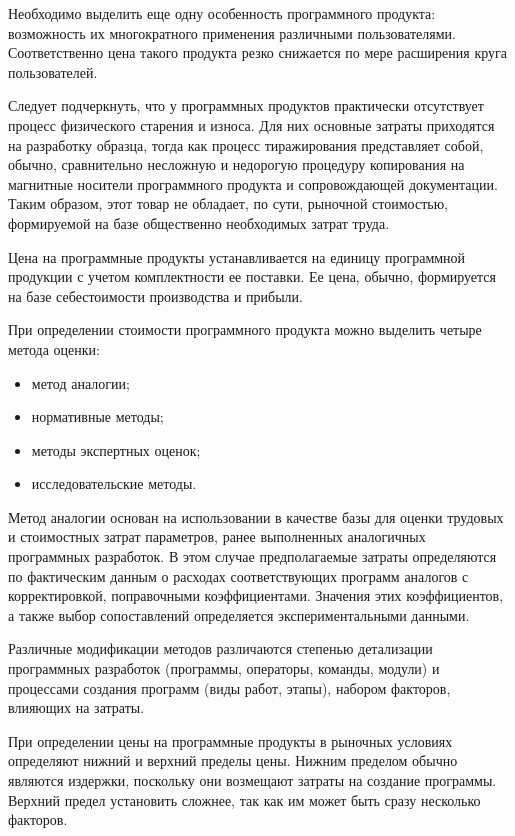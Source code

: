 \documentclass[utf8,usehyperref,12pt]{G7-32}
\begin{document}
Необходимо выделить еще одну особенность программного продукта: возможность их многократного применения различными пользователями. Соответственно цена такого продукта резко снижается по мере расширения круга пользователей.

Следует подчеркнуть, что у программных продуктов практически отсутствует процесс физического старения и износа. Для них основные затраты приходятся на разработку образца, тогда как процесс тиражирования представляет собой, обычно, сравнительно несложную и недорогую процедуру копирования на магнитные носители программного продукта и сопровождающей документации. Таким образом, этот товар не обладает, по сути, рыночной стоимостью, формируемой на базе общественно необходимых затрат труда\cite{eco_book}.

Цена на программные продукты устанавливается на единицу программной продукции с учетом комплектности ее поставки. Ее цена, обычно, формируется на базе себестоимости производства и прибыли.

При определении стоимости программного продукта можно выделить четыре метода оценки:
\begin{itemize}
 \item метод аналогии;
 \item нормативные методы;
 \item методы экспертных оценок;
 \item исследовательские методы.
\end{itemize}

Метод аналогии основан на использовании в качестве базы для оценки трудовых и стоимостных затрат параметров, ранее выполненных аналогичных программных разработок. В этом случае предполагаемые затраты определяются по фактическим данным о расходах соответствующих программ аналогов с корректировкой, поправочными коэффициентами. Значения этих коэффициентов, а также выбор сопоставлений определяется экспериментальными данными.

Различные модификации методов различаются степенью детализации программных разработок (программы, операторы, команды, модули) и процессами создания программ (виды работ, этапы), набором факторов, влияющих на затраты.

При определении цены на программные продукты в рыночных условиях определяют нижний и верхний пределы цены. Нижним пределом обычно являются издержки, поскольку они возмещают затраты на создание программы. Верхний предел установить сложнее, так как им может быть сразу несколько факторов.
\end{document}
